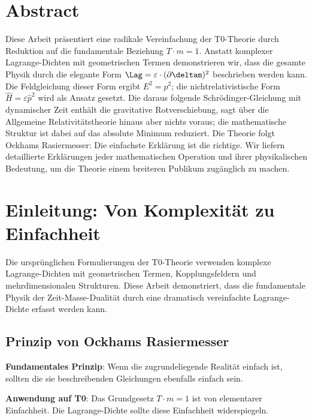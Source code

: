 \hfuzz=200pt
\allowdisplaybreaks

\section*{Abstract}
		Diese Arbeit präsentiert eine radikale Vereinfachung der T0-Theorie durch Reduktion auf die fundamentale Beziehung $T \cdot m = 1$. Anstatt komplexer Lagrange-Dichten mit geometrischen Termen demonstrieren wir, dass die gesamte Physik durch die elegante Form $\Lag = \varepsilon \cdot (\partial \deltam)^2$ beschrieben werden kann. Die Feldgleichung dieser Form ergibt $E^2 = p^2$; die nichtrelativistische Form $\hat{H} = \varepsilon \hat{p}^2$ wird als Ansatz gesetzt. Die daraus folgende Schrödinger-Gleichung mit dynamischer Zeit enthält die gravitative Rotverschiebung, sagt über die Allgemeine Relativitätstheorie hinaus aber nichts voraus; die mathematische Struktur ist dabei auf das absolute Minimum reduziert. Die Theorie folgt Ockhams Rasiermesser: Die einfachste Erklärung ist die richtige. Wir liefern detaillierte Erklärungen jeder mathematischen Operation und ihrer physikalischen Bedeutung, um die Theorie einem breiteren Publikum zugänglich zu machen.

	

	\section{Einleitung: Von Komplexität zu Einfachheit}
	
	Die ursprünglichen Formulierungen der T0-Theorie verwenden komplexe Lagrange-Dichten mit geometrischen Termen, Kopplungsfeldern und mehrdimensionalen Strukturen. Diese Arbeit demonstriert, dass die fundamentale Physik der Zeit-Masse-Dualität durch eine dramatisch vereinfachte Lagrange-Dichte erfasst werden kann.
	
	\subsection{Prinzip von Ockhams Rasiermesser}
	
	\begin{tcolorbox}[colback=blue!5!white,colframe=blue!75!black,title=Ockhams Rasiermesser in der Physik]
		\textbf{Fundamentales Prinzip}: Wenn die zugrundeliegende Realität einfach ist, sollten die sie beschreibenden Gleichungen ebenfalls einfach sein.
		
		\textbf{Anwendung auf T0}: Das Grundgesetz $T \cdot m = 1$ ist von elementarer Einfachheit. Die Lagrange-Dichte sollte diese Einfachheit widerspiegeln.
	\end{tcolorbox}
	
